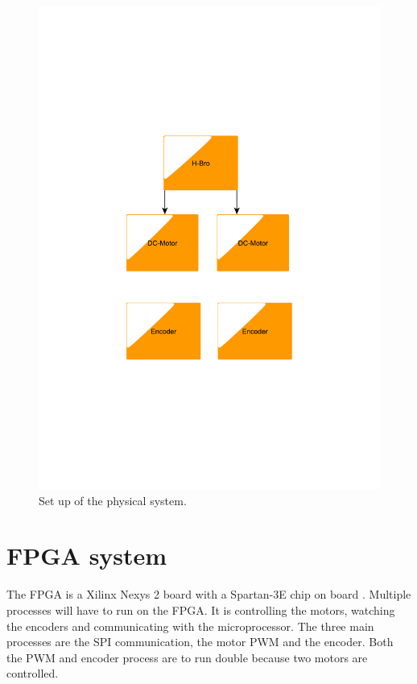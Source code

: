 \begin{figure}[htb]
	\centering
	\includegraphics[scale=0.42,trim=200 200 200 200]{graphics/phsycicalsystem} %
	\caption{Set up of the physical system.}
	\label{fig:phsysicalsystem}			%
\end{figure}

\section{FPGA system}\label{sec:FPGA}

The FPGA is a Xilinx Nexys 2 board with a Spartan-3E chip on board \cite{nexys2}. Multiple processes will have to run on the FPGA. It is controlling the motors, watching the encoders and communicating with the microprocessor. The three main processes are the SPI communication, the motor PWM and the encoder. Both the PWM and encoder process are to run double because two motors are controlled. 

